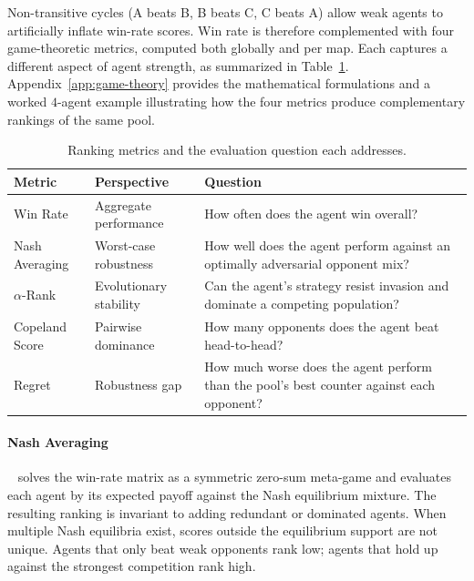 Non-transitive cycles (A beats B, B beats C, C beats A) allow weak agents to artificially inflate win-rate scores. Win rate is therefore complemented with four game-theoretic metrics, computed both globally and per map. Each captures a different aspect of agent strength, as summarized in Table~\ref{tab:metrics-summary}. Appendix~\ref{app:game-theory} provides the mathematical formulations and a worked $4$-agent example illustrating how the four metrics produce complementary rankings of the same pool.

\begin{table}[!ht]
\centering
\caption[Ranking metrics and the evaluation question each addresses]{Ranking metrics and the evaluation question each addresses.}
\label{tab:metrics-summary}
\renewcommand{\arraystretch}{1.25}
\footnotesize
\begin{tabularx}{\textwidth}{@{}l l X@{}}
\toprule
\textbf{Metric} & \textbf{Perspective} & \textbf{Question} \\
\midrule
Win Rate & Aggregate performance & How often does the agent win overall? \\
Nash Averaging & Worst-case robustness & How well does the agent perform against an optimally adversarial opponent mix? \\
$\alpha$-Rank & Evolutionary stability & Can the agent's strategy resist invasion and dominate a competing population? \\
Copeland Score & Pairwise dominance & How many opponents does the agent beat head-to-head? \\
Regret & Robustness gap & How much worse does the agent perform than the pool's best counter against each opponent? \\
\bottomrule
\end{tabularx}
\end{table}

\vspace{-0.5em}

\paragraph*{Nash Averaging}~\cite{balduzziReevaluatingEvaluation2018} solves the win-rate matrix as a symmetric zero-sum meta-game and evaluates each agent by its expected payoff against the Nash equilibrium mixture. The resulting ranking is invariant to adding redundant or dominated agents. When multiple Nash equilibria exist, scores outside the equilibrium support are not unique. Agents that only beat weak opponents rank low; agents that hold up against the strongest competition rank high.

